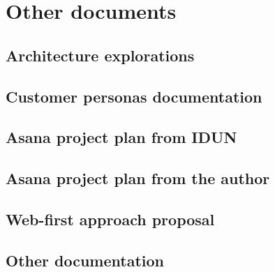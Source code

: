 \chapter{Other documents}
\label{appendix7-other-documents}

\section*{Architecture explorations}

\section*{Customer personas documentation}

\section*{Asana project plan from IDUN}

\section*{Asana project plan from the author}

\section*{Web-first approach proposal}

\section*{Other documentation}
